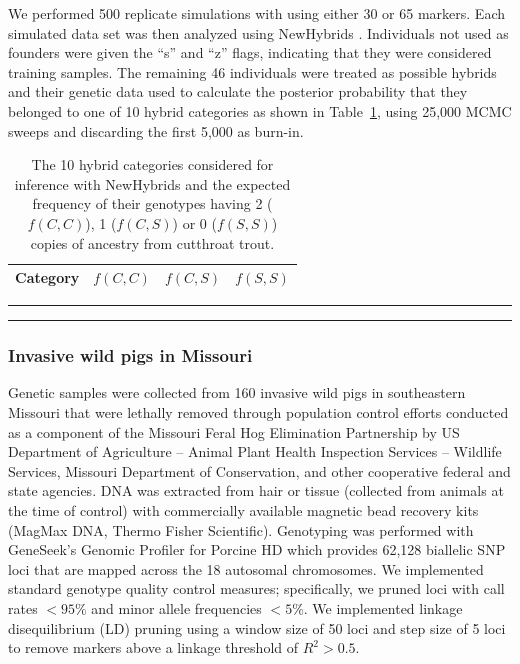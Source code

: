 {We performed 500 replicate simulations with \gscramble{} using either 30 or 65 markers.  Each
simulated data set was then analyzed using {\sc NewHybrids} \citep{anderson2002model}. Individuals not used as founders were given the ``s'' and ``z'' flags, indicating that they were considered training samples.  The remaining 46 individuals were treated as possible hybrids and their genetic data used to calculate the posterior probability that they belonged to one of 10 hybrid categories as shown in Table~\ref{tab:newhybcats}, using 25,000 MCMC sweeps and discarding the first 5,000 as burn-in.
\begin{table}
\caption{The 10 hybrid categories considered for inference with {\sc NewHybrids} and the
expected frequency of their genotypes having 2 ($f(C,C)$), 1 ($f(C,S)$) or 0 ($f(S,S)$) copies of ancestry from cutthroat trout.}
\label{tab:newhybcats}
{\small
\begin{tabular*}{0.48\textwidth}{@{\extracolsep{\fill}} lrrr}
\hline\hline
Category	& $f(C,C)$ &	$f(C,S)$ & 	$f(S,S)$ \\ \hline

\end{tabular*}
}
\vspace*{-2.3ex}\hrule\vspace*{0.3ex}\hrule
\end{table}



\subsubsection*{Invasive wild pigs in Missouri}

Genetic samples were collected from 160 invasive wild pigs in southeastern
Missouri that were lethally removed through population control efforts
conducted as a component of the Missouri Feral Hog Elimination Partnership
by US Department of Agriculture – Animal Plant Health Inspection Services –
Wildlife Services, Missouri Department of Conservation, and other cooperative
federal and state agencies.
DNA was extracted from hair or tissue (collected from animals at the time of control) with
commercially available magnetic bead recovery kits (MagMax DNA, Thermo Fisher Scientific).
Genotyping was performed with GeneSeek’s Genomic Profiler for Porcine HD which provides
62,128 biallelic SNP loci that are mapped across the 18 autosomal chromosomes.
We implemented standard genotype quality control measures; specifically, we pruned loci with
call rates $<95\%$ and minor allele frequencies $<5\%$.
We implemented linkage disequilibrium (LD) pruning using a window size of 50 loci and step size
of 5 loci to remove markers above a linkage threshold of $R^2 > 0.5$.

}
